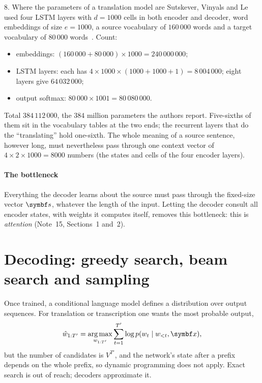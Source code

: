 \documentclass[11pt]{article}
\begin{document}
\begin{worked}{8. Where the parameters of a translation model are}
Sutskever, Vinyals and Le used four LSTM layers with $d = 1000$ cells in both encoder and decoder, word embeddings of size
$e = 1000$, a source vocabulary of $160\,000$ words and a target vocabulary of $80\,000$ words~\cite{sutskever2014}. Count:
\begin{itemize}
\item embeddings: $(160\,000 + 80\,000) \times 1000 = 240\,000\,000$;
\item LSTM layers: each has $4 \times 1000 \times (1000 + 1000 + 1) = 8\,004\,000$; eight layers give $64\,032\,000$;
\item output softmax: $80\,000 \times 1001 = 80\,080\,000$.
\end{itemize}
Total $384\,112\,000$, the $384$ million parameters the authors report. Five-sixths of them sit in the vocabulary
tables at the two ends; the recurrent layers that do the ``translating'' hold one-sixth. The whole meaning of a source
sentence, however long, must nevertheless pass through one context vector of $4 \times 2 \times 1000 = 8000$ numbers (the
states and cells of the four encoder layers).
\end{worked}

\paragraph{The bottleneck} Everything the decoder learns about the source must pass through the fixed-size vector
$\vect{s}$, whatever the length of the input. Letting the decoder consult all encoder states, with weights it computes
itself, removes this bottleneck: this is \emph{attention} (Note~15, Sections~1 and~2).

\section{Decoding: greedy search, beam search and sampling}\label{sec:decode}

Once trained, a conditional language model defines a distribution over output sequences. For translation or
transcription one wants the most probable output,
\begin{equation}\label{eq:map}
  \hat{w}_{1:T'} = \argmax_{w_{1:T'}} \sum_{t=1}^{T'} \log p(w_t \mid w_{<t}, \x) ,
\end{equation}
but the number of candidates is $V^{T'}$, and the network's state after a prefix depends on the whole prefix, so dynamic
programming does not apply. Exact search is out of reach; decoders approximate it.
\end{document}
